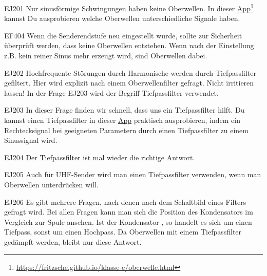 \begin{sol}{EJ201}
Nur sinusförmige Schwingungen haben keine Oberwellen. In dieser 
\href{https://fritzsche.github.io/klasse-e/oberwelle.html}{App}\footnote{\href{https://fritzsche.github.io/klasse-e/oberwelle.html}{https://fritzsche.github.io/klasse-e/oberwelle.html}} kannst Du ausprobieren welche Oberwellen unterschiedliche Signale haben.

\end{sol}  

\begin{sol}{EF404}
Wenn die Senderendstufe neu eingestellt wurde, sollte zur Sicherheit überprüft werden, dass keine Oberwellen entstehen.
Wenn nach der Einstellung z.B. kein reiner Sinus mehr erzeugt wird, sind Oberwellen dabei.
\end{sol}  


\begin{sol}{EJ202}
Hochfrequente Störungen durch Harmonische werden durch Tiefpassfilter gefiltert. Hier wird explizit nach einem Oberwellenfilter gefragt. Nicht irritieren lassen!
In der Frage EJ203 wird der Begriff Tiefpassfilter verwendet.
\end{sol} 

\begin{sol}{EJ203}
In dieser Frage finden wir schnell, dass uns ein Tiefpassfilter hilft.
Du kannst einen Tiefpassfilter in dieser \href{https://fritzsche.github.io/klasse-e/lpf.html}{App}
praktisch ausprobieren, indem ein Rechtecksignal bei geeigneten Parametern durch einen Tiefpassfilter zu einem Sinussignal wird.
\end{sol}  

\begin{sol}{EJ204}
Der Tiefpassfilter ist mal wieder die richtige Antwort.
\end{sol}  


\begin{sol}{EJ205}
Auch für UHF-Sender wird man einen Tiefpassfilter verwenden, wenn man Oberwellen unterdrücken will.
\end{sol}  


\begin{sol}{EJ206}
Es gibt mehrere Fragen, nach denen nach dem Schaltbild eines Filters gefragt wird. Bei allen Fragen kann man sich die Position des Kondensators im Vergleich zur Spule ansehen. Ist der Kondensator , so handelt es sich um einen Tiefpass, sonst um einen Hochpass.
Da Oberwellen mit einem Tiefpassfilter gedämpft werden, bleibt nur diese Antwort.
\end{sol}  

